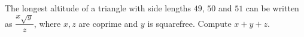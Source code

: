 The longest altitude of a triangle with side lengths $49$, $50$ and $51$ can be written as $\dfrac{x\sqrt y}{z}$, where $x,z$ are coprime and $y$ is squarefree. Compute $x+y+z$.
